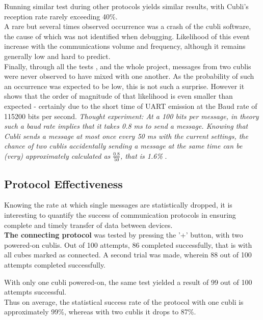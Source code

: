Running similar test during other protocols yields similar results, with Cubli's reception rate rarely exceeding 40\%.\\

A rare but several times observed occurrence was a crash of the cubli software, the cause of which was not identified when debugging. Likelihood of this event increase with the communications volume and frequency, although it remains generally low and hard to predict.\\

Finally, through all the tests , and the whole project, messages from two cublis were never observed to have mixed with one another. As the probability of such an occurrence was expected to be low, this is not such a surprise. However it shows that the order of magnitude of that likelihood is even smaller than expected - certainly due to the short time of UART emission at the Baud rate of 115200 bits per second. \textit{ Thought experiment: At a 100 bits per message, in theory such a baud rate implies that it takes 0.8 ms to send a message. Knowing that Cubli sends a message at most once every 50 ms with the current settings, the chance of two cublis accidentally sending a message at the same time can be (very) approximately calculated as $\frac{0.8}{50}$, that is 1.6\% }.

\subsection{Protocol Effectiveness}

Knowing the rate at which single messages are statistically dropped, it is interesting to quantify the success of communication protocols in ensuring complete and timely transfer of data between devices. \\

\textbf{The connecting protocol} was tested by pressing the '+' button, with two powered-on cublis. Out of 100 attempts, 86 completed successfully, that is with all cubes marked as connected. A second trial was made, wherein 88 out of 100 attempts completed successfully.

With only one cubli powered-on, the same test yielded a result of 99 out of 100 attempts successful.\\

Thus on average, the statistical success rate of the protocol with one cubli is approximately 99\%, whereas with two cublis it drops to 87\%. \\

